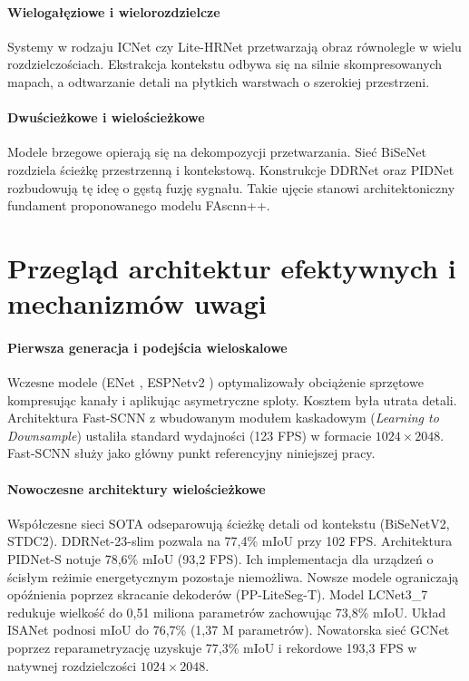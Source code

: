 \paragraph{Wielogałęziowe i wielorozdzielcze}
Systemy w rodzaju ICNet  czy Lite-HRNet  przetwarzają obraz równolegle w wielu rozdzielczościach. Ekstrakcja kontekstu odbywa się na silnie skompresowanych mapach, a odtwarzanie detali na płytkich warstwach o szerokiej przestrzeni.

\paragraph{Dwuścieżkowe i wielościeżkowe}
Modele brzegowe opierają się na dekompozycji przetwarzania. Sieć BiSeNet  rozdziela ścieżkę przestrzenną i kontekstową. Konstrukcje DDRNet  oraz PIDNet  rozbudowują tę ideę o gęstą fuzję sygnału. Takie ujęcie stanowi architektoniczny fundament proponowanego modelu FAscnn++.

\section{Przegląd architektur efektywnych i mechanizmów uwagi}

\paragraph{Pierwsza generacja i podejścia wieloskalowe}
Wczesne modele (ENet , ESPNetv2 ) optymalizowały obciążenie sprzętowe kompresując kanały i aplikując asymetryczne sploty. Kosztem była utrata detali. Architektura Fast-SCNN  z wbudowanym modułem kaskadowym (\textit{Learning to Downsample}) ustaliła standard wydajności (123 FPS) w formacie $1024 \times 2048$. Fast-SCNN służy jako główny punkt referencyjny niniejszej pracy.

\paragraph{Nowoczesne architektury wielościeżkowe}
Współczesne sieci SOTA odseparowują ścieżkę detali od kontekstu (BiSeNetV2, STDC2). DDRNet-23-slim pozwala na 77,4\% mIoU przy 102 FPS. Architektura PIDNet-S notuje 78,6\% mIoU (93,2 FPS). Ich implementacja dla urządzeń o ścisłym reżimie energetycznym pozostaje niemożliwa. Nowsze modele ograniczają opóźnienia poprzez skracanie dekoderów (PP-LiteSeg-T). Model LCNet3\_7 redukuje wielkość do 0,51 miliona parametrów zachowując 73,8\% mIoU. Układ ISANet podnosi mIoU do 76,7\% (1,37 M parametrów). Nowatorska sieć GCNet poprzez reparametryzację uzyskuje 77,3\% mIoU i rekordowe 193,3 FPS w natywnej rozdzielczości $1024 \times 2048$.

